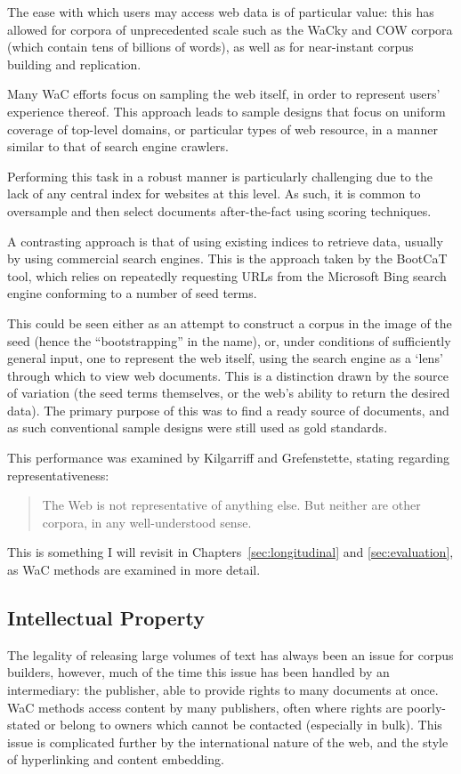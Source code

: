 The ease with which users may access web data is of particular value: this has allowed for corpora of unprecedented scale such as the WaCky\cite{baroni2009wacky} and COW\cite{schafer2012building} corpora (which contain tens of billions of words), as well as for near-instant corpus building and replication.

Many WaC efforts focus on sampling the web itself, in order to represent users' experience thereof.  This approach leads to sample designs that focus on uniform coverage of top-level domains, or particular types of web resource, in a manner similar to that of search engine crawlers.

Performing this task in a robust manner is particularly challenging due to the lack of any central index for websites at this level.  As such, it is common to oversample and then select documents after-the-fact using scoring techniques\cite{schafer2013web,schafer2014focused}.

A contrasting approach is that of using existing indices to retrieve data, usually by using commercial search engines.  This is the approach taken by the BootCaT tool, which relies on repeatedly requesting URLs from the Microsoft Bing search engine conforming to a number of seed terms.

This could be seen either as an attempt to construct a corpus in the image of the seed (hence the ``bootstrapping'' in the name), or, under conditions of sufficiently general input, one to represent the web itself, using the search engine as a `lens' through which to view web documents.  This is a distinction drawn by the source of variation (the seed terms themselves, or the web's ability to return the desired data).  The primary purpose of this was to find a ready source of documents, and as such conventional sample designs were still used as gold standards.

This performance was examined by Kilgarriff and Grefenstette\cite{kilgarriff2003introduction}, stating regarding representativeness:

\begin{quote}
The Web is not representative of anything else. But neither are other corpora, in any
well-understood sense.
\end{quote}

This is something I will revisit in Chapters~\ref{sec:longitudinal} and \ref{sec:evaluation}, as WaC methods are examined in more detail.


\subsection{Intellectual Property}
The legality of releasing large volumes of text has always been an issue for corpus builders, however, much of the time this issue has been handled by an intermediary: the publisher, able to provide rights to many documents at once.  WaC methods access content by many publishers, often where rights are poorly-stated or belong to owners which cannot be contacted (especially in bulk).  This issue is complicated further by the international nature of the web, and the style of hyperlinking and content embedding\cite{hemming2010copyright}.  

